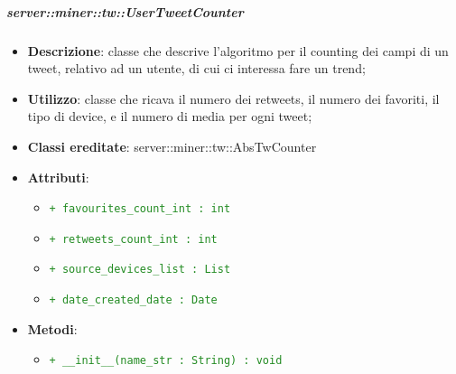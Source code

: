 	\subparagraph{server::miner::tw::UserTweetCounter} %
		\label{subp:server_miner_tw_UserTweetCounter}
			\begin{itemize}
				\item \textbf{Descrizione}: classe che descrive l'algoritmo per il counting dei campi di un tweet, relativo ad un utente, di cui ci interessa fare un trend;
				\item \textbf{Utilizzo}: classe che ricava il numero dei retweets, il numero dei favoriti, il tipo di device, e il numero di media per ogni tweet;
				\item \textbf{Classi ereditate}: server::miner::tw::AbsTwCounter
				\item \textbf{Attributi}:    
					\begin{itemize}
						\item \textcolor{forestgreen}{\texttt{+ favourites\_count\_int : int}}
						\item \textcolor{forestgreen}{\texttt{+ retweets\_count\_int : int}}
						\item \textcolor{forestgreen}{\texttt{+ source\_devices\_list : List}}
						\item \textcolor{forestgreen}{\texttt{+ date\_created\_date : Date}}
					\end{itemize}
				\item \textbf{Metodi}:  
					\begin{itemize}
						\item \textcolor{forestgreen}{\texttt{+ \_\_init\_\_(name\_str : String) : void}}

\end{itemize}
\end{itemize}
